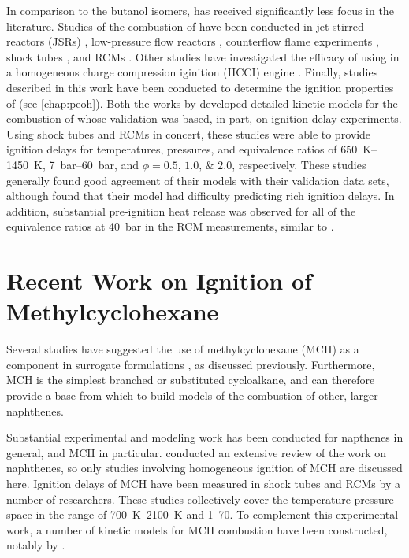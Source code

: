 \documentclass[../main.tex]{subfiles}
\begin{document}
In comparison to the butanol isomers, \iPeOH{} has received significantly
less focus in the literature. Studies of the combustion of \iPeOH{}
have been conducted in jet stirred reactors (JSRs) \cite{Dayma2011,Togbe2011,Sarathy2013}, low-pressure flow
reactors \cite{Welz2012}, counterflow flame experiments \cite{Sarathy2013},
shock tubes \cite{Sarathy2013, Tsujimura2012, Tang2013}, and RCMs
\cite{Sarathy2013, Tsujimura2012}. Other studies have investigated
the efficacy of using \iPeOH{} in a homogeneous charge compression iginition (HCCI) engine \cite{Tsujimura2011,
Yacoub1998, Yang2010}. Finally, studies described in this work have
been conducted to determine the ignition properties of \iPeOH{} (see \cref{chap:peoh}).
Both the works by \textcite{Tsujimura2012, Sarathy2013} developed
detailed kinetic models for the combustion of \iPeOH{} whose validation
was based, in part, on ignition delay experiments. Using shock tubes and
RCMs in concert, these studies were able to provide ignition delays
for temperatures, pressures, and equivalence ratios of
\SIrange{650}{1450}{\kelvin}, \SIrange{7}{60}{\bar}, and $\phi =
\numlist{0.5;1.0;2.0}$, respectively. These studies generally found good
agreement of their models with their validation data sets, although
\textcite{Sarathy2013} found that their model had difficulty predicting
rich ignition delays. In addition, substantial pre-ignition heat release
was observed for all of the equivalence ratios at \SI{40}{\bar} in the
RCM measurements, similar to \tBuOH{}.

\section{Recent Work on Ignition of Methylcyclohexane}

Several studies have suggested the use of methylcyclohexane (MCH) as a
component in surrogate formulations \cite{Bieleveld2009,Naik2005}, as
discussed previously. Furthermore, MCH is the simplest branched or
substituted cycloalkane, and can therefore provide a base from which
to build models of the combustion of other, larger naphthenes.

Substantial experimental and modeling work has been conducted for
napthenes in general, and MCH in particular. \textcite{Pitz2011}
conducted an extensive review of the work on naphthenes, so only studies
involving homogeneous ignition of MCH are discussed here. Ignition delays of MCH
have been measured in shock tubes \cite{Rotavera2013, Vasu2009,
Vanderover2009, Hawthorn1966, Orme2006, Hong2011} and RCMs \cite{Tanaka2003,
Pitz2007, Mittal2009} by a number of researchers. These studies collectively
cover the temperature-pressure space in the range of \SIrange{700}{2100}{\kelvin}
and \SIrange{1}{70}{\atmosphere}. To complement this experimental work, a number
of kinetic models for MCH combustion have been constructed, notably by
\textcite{Orme2006, Pitz2007}.
\end{document}
